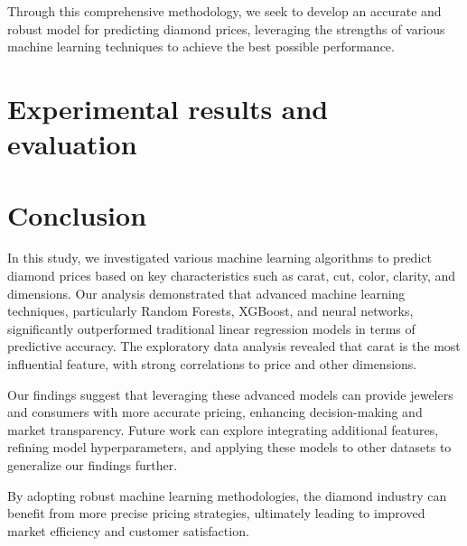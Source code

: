 \documentclass[conference]{IEEEtran}
\begin{document}
Through this comprehensive methodology, we seek to develop an accurate and robust model for predicting diamond prices, leveraging the strengths of various machine learning techniques to achieve the best possible performance.

\section{Experimental results and evaluation}

\section{Conclusion}

In this study, we investigated various machine learning algorithms to predict diamond prices based on key characteristics such as carat, cut, color, clarity, and dimensions. Our analysis demonstrated that advanced machine learning techniques, particularly Random Forests, XGBoost, and neural networks, significantly outperformed traditional linear regression models in terms of predictive accuracy. The exploratory data analysis revealed that carat is the most influential feature, with strong correlations to price and other dimensions. 

Our findings suggest that leveraging these advanced models can provide jewelers and consumers with more accurate pricing, enhancing decision-making and market transparency. Future work can explore integrating additional features, refining model hyperparameters, and applying these models to other datasets to generalize our findings further.

By adopting robust machine learning methodologies, the diamond industry can benefit from more precise pricing strategies, ultimately leading to improved market efficiency and customer satisfaction.
\end{document}
